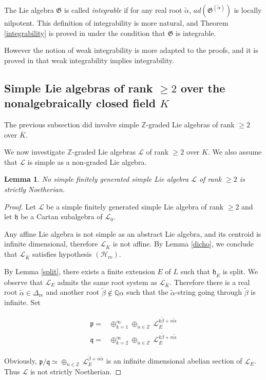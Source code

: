 \documentclass[11pt, letterpaper, reqno]{amsart}
\newtheorem{lemma}[theorem]{Lemma}
\theoremstyle{definition}
\newcommand{\Q}{{\mathbb Q}}
\newcommand{\Z}{{\mathbb Z}}
\newcommand{\cL}{\mathcal L}
\newcommand{\fh}{\mathfrak{h}}
\newcommand{\fp}{\mathfrak{p}}
\newcommand{\fq}{\mathfrak{q}}
\newcommand{\fG}{\mathfrak{G}}
\begin{document}
 The Lie algebra 
$\fG$ is called {\it integrable} if
for any real root $\tilde{\alpha}$, 
$ad(\fG^{(\tilde\alpha)})$ is locally nilpotent.
This definition of integrability is more natural, and Theorem \ref{integrability} 
is proved in \cite{Mathieu-inv1} under the condition that $\fG$ is integrable.

However the notion of weak integrability is more
adapted to the proofs, and it is proved
in \cite{Mathieu-inv2} that weak integrability implies integrability.

\subsection{Simple Lie algebras of rank $\geq 2$ over the nonalgebraically closed field $K$}

The previous subsection did involve
simple $\Z$-graded Lie algebras of rank $\geq 2$
over $\overline{K}$. 

We now investigate
$\Z$-graded Lie algebras $\cL$ of rank $\geq 2$
over $K$. We also assume that $\cL$ is simple as a non-graded Lie algebra.

\begin{lemma}\label{Nork2} No simple finitely generated simple Lie algebra 
$\cL$ of rank $\geq 2$ is
strictly Noetherian.
\end{lemma}

\begin{proof} Let $\cL$ be a simple finitely generated simple Lie algebra of rank $\geq 2$ and let $\fh$ be a Cartan subalgebra of $\cL_0$. 

Any affine Lie algebra is not simple as an abstract
Lie algebra, and its centroid is infinite dimensional,
therefore $\cL_{\overline K}$ is not affine.
 By Lemma \ref{dicho}, we conclude that $\cL_{\overline K}$  satisfies hypothesis 
$(\mathcal{H}_{\operatorname{re}})$.

By Lemma \ref{split},  there exists a finite extension $E$ of $L$ such that 
$\fh_E$ is split. We observe that
$\cL_E$ admits the same root system as 
$\cL_{\overline K}$. Therefore there is a real root
$\tilde{\alpha}\in \Delta_{\operatorname{re}}$
and another  root 
$\tilde{\beta}\not\in\Q\alpha$ such that the $\tilde{\alpha}$-string going through $\tilde{\beta}$ is infinite.
Set 

\begin{align*}
\fp=&\oplus_{k=1}^\infty
\oplus_{n\in\Z}\, \cL_E^{k\tilde{\beta}+n\tilde{\alpha}}\\
\fq=&\oplus_{k=2}^\infty
\oplus_{n\in\Z}\, \cL_E^{k\tilde{\beta}+n\tilde{\alpha}}
\end{align*}

\noindent Obviously,
$\fp/\fq\simeq  
\oplus_{n\in\Z}\, \cL_E^{\tilde{\beta}+n\tilde{\alpha}}$ is an infinite dimensional abelian section of $\cL_E$. Thus
$\cL$ is not strictly Noetherian.
\end{proof}
\end{document}
